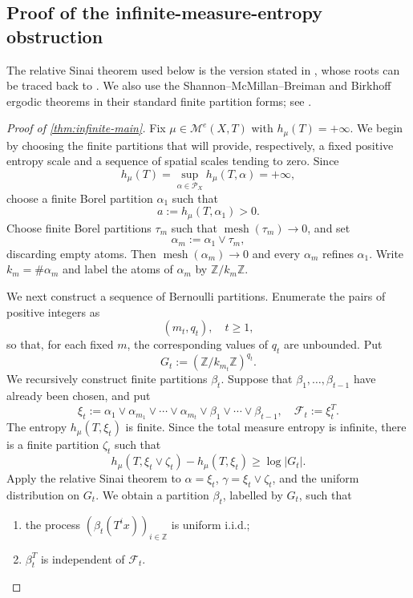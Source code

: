 \documentclass[12pt,letterpaper,reqno]{amsart}
\newcommand{\Z}{\mathbb Z}
\newcommand{\cF}{\mathcal F}
\newcommand{\cP}{\mathcal P}
\newcommand{\mesh}{\operatorname{mesh}}
\theoremstyle{definition}
\theoremstyle{remark}
\numberwithin{equation}{section}
\begin{document}
	\subsection{Proof of the infinite-measure-entropy obstruction}
	\label{sec:infinite-proof}
	
    The relative Sinai theorem used below is the version stated in \cite[Lemma~4.2]{HYZ2014}, whose roots can be traced back to \cite{OrnsteinWeiss1975,Thouvenot1975,Kieffer1984}. We also use the
	Shannon--McMillan--Breiman and Birkhoff ergodic theorems in their standard finite
	partition forms; see \cite{Walters1982}.
	
	\begin{proof}[Proof of \cref{thm:infinite-main}]
		Fix $\mu\in \mathcal{M}^e(X,T)$ with $h_\mu(T)=+\infty$.  We begin by
		choosing the finite partitions that will provide, respectively, a fixed
		positive entropy scale and a sequence of spatial scales tending to zero.
		Since
		\[
		h_\mu(T)=\sup_{\alpha\in\cP_X}h_\mu(T,\alpha)=+\infty,
		\]
		choose a finite Borel partition $\alpha_1$ such that
		\[
		a:=h_\mu(T,\alpha_1)>0.
		\]
		Choose finite Borel partitions $\tau_m$ such that
		$\mesh(\tau_m)\to0$, and set
		\[
		\alpha_m:=\alpha_1\vee\tau_m,
		\]
		discarding empty atoms. Then $\mesh(\alpha_m)\to0$ and every $\alpha_m$
		refines $\alpha_1$. Write
		$k_m=\#\alpha_m$ and label the atoms of $\alpha_m$ by
		$\Z/k_m\Z$.
		
		
		We next construct a sequence of Bernoulli partitions.  Enumerate
		the pairs of positive integers as
		\[
		(m_t,q_t),\quad t\geq1,
		\]
		so that, for each fixed $m$, the corresponding values of $q_t$ are
		unbounded. Put
		\[
		G_t:=(\Z/k_{m_t}\Z)^{q_t}.
		\]
		We recursively construct finite partitions $\beta_t$. Suppose that
		$\beta_1,\ldots,\beta_{t-1}$ have already been chosen, and put
		\[
		\xi_t
		:=
		\alpha_1\vee
		\alpha_{m_1}\vee\cdots\vee\alpha_{m_t}\vee
		\beta_1\vee\cdots\vee\beta_{t-1},
		\quad
		\cF_t:=\xi_t^T.
		\]
		The entropy $h_\mu(T,\xi_t)$ is finite. Since the total measure entropy is
		infinite, there is a finite partition $\zeta_t$ such that
		\[
		h_\mu(T,\xi_t\vee\zeta_t)-h_\mu(T,\xi_t)
		\geq\log|G_t|.
		\]
		Apply the relative Sinai theorem to
		$\alpha=\xi_t$, $\gamma=\xi_t\vee\zeta_t$, and the uniform distribution on
		$G_t$. We obtain a partition $\beta_t$, labelled by $G_t$, such that
		\begin{enumerate}
			\item the process $(\beta_t(T^ix))_{i\in\Z}$ is uniform i.i.d.;
			\item $\beta_t^T$ is independent of $\cF_t$.
		\end{enumerate}
		

\end{proof}
\end{document}
